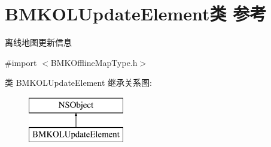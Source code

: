 \hypertarget{interface_b_m_k_o_l_update_element}{\section{B\+M\+K\+O\+L\+Update\+Element类 参考}
\label{interface_b_m_k_o_l_update_element}
}


离线地图更新信息  




{\ttfamily \#import $<$B\+M\+K\+Offline\+Map\+Type.\+h$>$}

类 B\+M\+K\+O\+L\+Update\+Element 继承关系图\+:\begin{figure}[H]
\begin{center}
\leavevmode
\includegraphics[height=2.000000cm]{interface_b_m_k_o_l_update_element}
\end{center}
\end{figure}
